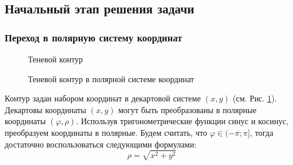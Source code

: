 \documentclass[a4paper,12pt, titlepage]{article}
\begin{document}
\subsection{Начальный этап решения задачи}
\subsubsection{Переход в полярную систему координат}

\begin{figure}[h]
\noindent{}
\caption{Теневой контур}
\label{4k-contur-1}
\end{figure}

\begin{figure}[h]
\noindent{}
\caption{Теневой контур в полярной системе координат}
\label{4k-contur-per}
\end{figure}


Контур задан набором координат в декартовой системе $(x,y)$ (см. Рис. \ref{4k-contur-1}). Декартовы координаты $(x,y)$ могут быть 
преобразованы в полярные координаты $(\varphi,\rho)$. Используя тригонометрические функции синус и косинус, преобразуем 
координаты 
в полярные. Будем считать, что  $\varphi\in (-\pi;\pi]$, тогда достаточно воспользоваться следующими формулами:
$$\rho = \sqrt{ {x}^{2} + {y}^{2} }$$
\end{document}
